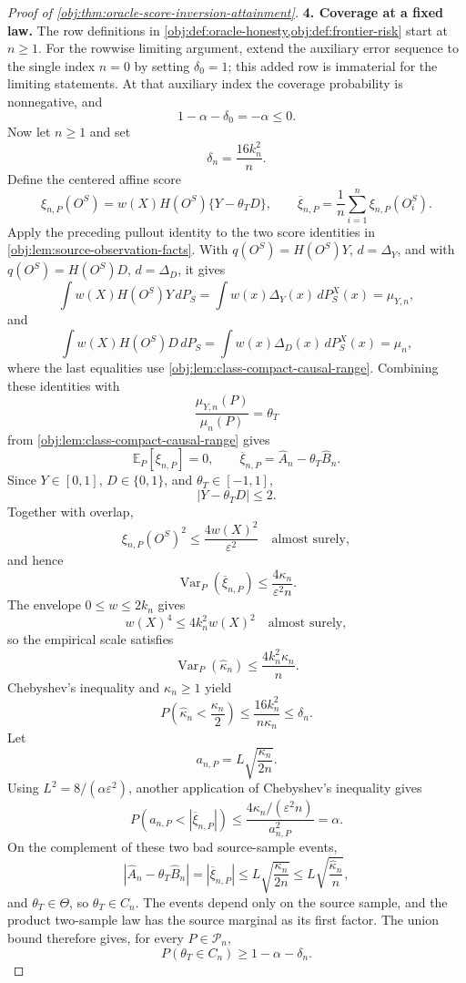 \begin{proof}[Proof of \cref{obj:thm:oracle-score-inversion-attainment}]
\textbf{4. Coverage at a fixed law.}
The row definitions in \cref{obj:def:oracle-honesty,obj:def:frontier-risk} start at \(n\ge1\). For the rowwise limiting argument, extend the auxiliary error sequence to the single index \(n=0\) by setting \(\delta_0=1\); this added row is immaterial for the limiting statements. At that auxiliary index the coverage probability is nonnegative, and
\[
1-\alpha-\delta_0=-\alpha\le0.
\]
Now let \(n\ge1\) and set
\[
\delta_n=\frac{16k_n^2}{n}.
\]
Define the centered affine score
\[
\xi_{n,P}(O^S)
=
w(X)H(O^S)\{Y-\theta_TD\},
\qquad
\overline\xi_{n,P}
=
\frac1n\sum_{i=1}^n\xi_{n,P}(O_i^S).
\]
Apply the preceding pullout identity to the two score identities in \cref{obj:lem:source-observation-facts}. With \(q(O^S)=H(O^S)Y\), \(d=\Delta_Y\), and with \(q(O^S)=H(O^S)D\), \(d=\Delta_D\), it gives
\[
\int w(X)H(O^S)Y\,dP_S
=
\int w(x)\Delta_Y(x)\,dP_S^X(x)
=
\mu_{Y,n},
\]
and
\[
\int w(X)H(O^S)D\,dP_S
=
\int w(x)\Delta_D(x)\,dP_S^X(x)
=
\mu_n,
\]
where the last equalities use \cref{obj:lem:class-compact-causal-range}. Combining these identities with
\[
\frac{\mu_{Y,n}(P)}{\mu_n(P)}=\theta_T
\]
from \cref{obj:lem:class-compact-causal-range} gives
\[
\mathbb E_P[\xi_{n,P}]=0,
\qquad
\overline\xi_{n,P}=\widehat A_n-\theta_T\widehat B_n .
\]
Since \(Y\in[0,1]\), \(D\in\{0,1\}\), and \(\theta_T\in[-1,1]\),
\[
|Y-\theta_TD|\le2 .
\]
Together with overlap,
\[
\xi_{n,P}(O^S)^2
\le
\frac{4w(X)^2}{\varepsilon^2}
\quad\text{almost surely},
\]
and hence
\[
\operatorname{Var}_P(\overline\xi_{n,P})
\le
\frac{4\kappa_n}{\varepsilon^2 n}.
\]
The envelope \(0\le w\le2k_n\) gives
\[
w(X)^4\le4k_n^2w(X)^2
\quad\text{almost surely},
\]
so the empirical scale satisfies
\[
\operatorname{Var}_P(\widehat\kappa_n)
\le
\frac{4k_n^2\kappa_n}{n}.
\]
Chebyshev's inequality and \(\kappa_n\ge1\) yield
\[
P\!\left(\widehat\kappa_n<\frac{\kappa_n}{2}\right)
\le
\frac{16k_n^2}{n\kappa_n}
\le
\delta_n .
\]
Let
\[
a_{n,P}=L\sqrt{\frac{\kappa_n}{2n}}.
\]
Using \(L^2=8/(\alpha\varepsilon^2)\), another application of Chebyshev's inequality gives
\[
P\!\left(a_{n,P}<|\overline\xi_{n,P}|\right)
\le
\frac{4\kappa_n/(\varepsilon^2 n)}{a_{n,P}^2}
=
\alpha .
\]
On the complement of these two bad source-sample events,
\[
|\widehat A_n-\theta_T\widehat B_n|
=
|\overline\xi_{n,P}|
\le
L\sqrt{\frac{\kappa_n}{2n}}
\le
L\sqrt{\frac{\widehat\kappa_n}{n}},
\]
and \(\theta_T\in\Theta\), so \(\theta_T\in C_n\). The events depend only on the source sample, and the product two-sample law has the source marginal as its first factor. The union bound therefore gives, for every \(P\in\mathcal P_n\),
\[
P(\theta_T\in C_n)\ge1-\alpha-\delta_n .
\] %


\end{proof}
